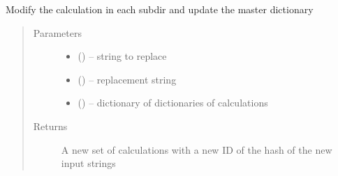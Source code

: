 \documentclass[letterpaper,10pt,english]{sphinxmanual}
\begin{document}
\begin{fulllineitems}
\label{\detokenize{prep:prep.generateAnotherCalc}}
Modify the calculation in each subdir and update the master dictionary
\begin{quote}\begin{description}
\item[{Parameters}] \leavevmode\begin{itemize}
\item {} 
 () -- string to replace

\item {} 
 () -- replacement string

\item {} 
 () -- dictionary of dictionaries of calculations

\end{itemize}

\item[{Returns}] \leavevmode
A new set of calculations with a new ID of the hash of the new input strings

\end{description}\end{quote}

\end{fulllineitems}


\begin{fulllineitems}
\label{\detokenize{prep:prep.getMPGrid}}
\end{fulllineitems}

\end{document}
